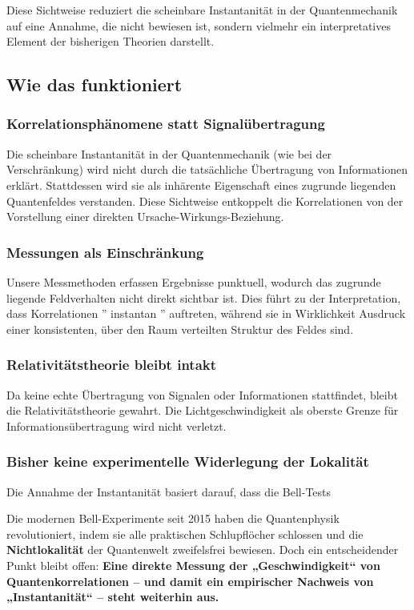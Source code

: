 \documentclass[12pt,a4paper]{article}
\begin{document}
	Diese Sichtweise reduziert die scheinbare Instantanität in der Quantenmechanik auf eine Annahme, die nicht bewiesen ist, sondern vielmehr ein interpretatives Element der bisherigen Theorien darstellt.
	
	\subsection{Wie das funktioniert}
	\subsubsection{Korrelationsphänomene statt Signalübertragung}
	Die scheinbare Instantanität in der Quantenmechanik (wie bei der Verschränkung) wird nicht durch die tatsächliche Übertragung von Informationen erklärt. Stattdessen wird sie als inhärente Eigenschaft eines zugrunde liegenden Quantenfeldes verstanden. Diese Sichtweise entkoppelt die Korrelationen von der Vorstellung einer direkten Ursache-Wirkungs-Beziehung.
	
	\subsubsection{Messungen als Einschränkung}
	Unsere Messmethoden erfassen Ergebnisse punktuell, wodurch das zugrunde liegende Feldverhalten nicht direkt sichtbar ist. Dies führt zu der Interpretation, dass Korrelationen '' instantan '' auftreten, während sie in Wirklichkeit Ausdruck einer konsistenten, über den Raum verteilten Struktur des Feldes sind.
	
	\subsubsection{Relativitätstheorie bleibt intakt}
	Da keine echte Übertragung von Signalen oder Informationen stattfindet, bleibt die Relativitätstheorie gewahrt. Die Lichtgeschwindigkeit als oberste Grenze für Informationsübertragung wird nicht verletzt.
	
	\subsubsection{Bisher keine experimentelle Widerlegung der Lokalität}
	Die Annahme der Instantanität basiert darauf, dass die Bell-Tests 


Die modernen Bell-Experimente seit 2015 haben die Quantenphysik revolutioniert, indem sie alle praktischen Schlupflöcher schlossen und die \textbf{Nichtlokalität} der Quantenwelt zweifelsfrei bewiesen. Doch ein entscheidender Punkt bleibt offen:  
\textbf{Eine direkte Messung der „Geschwindigkeit“ von Quantenkorrelationen – und damit ein empirischer Nachweis von „Instantanität“ – steht weiterhin aus.}
\end{document}
